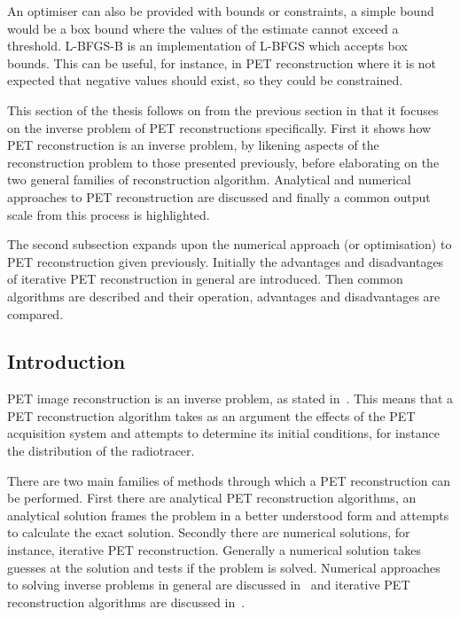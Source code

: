                 An optimiser can also be provided with bounds or constraints, a simple bound would be a box bound where the values of the estimate cannot exceed a threshold. \gls{L-BFGS-B} is an implementation of \gls{L-BFGS} which accepts box bounds. This can be useful, for instance, in \gls{PET} reconstruction where it is not expected that negative values should exist, so they could be constrained.
            
        This section of the thesis follows on from the previous section in that it focuses on the inverse problem of \gls{PET} reconstructions specifically. First it shows how \gls{PET} reconstruction is an inverse problem, by likening aspects of the reconstruction problem to those presented previously, before elaborating on the two general families of reconstruction algorithm. Analytical and numerical approaches to \gls{PET} reconstruction are discussed and finally a common output scale from this process is highlighted.
            
        The second subsection expands upon the numerical approach (or optimisation) to \gls{PET} reconstruction given previously. Initially the advantages and disadvantages of iterative \gls{PET} reconstruction in general are introduced. Then common algorithms are described and their operation, advantages and disadvantages are compared. 
        
        \subsection{Introduction} \label{sec:pet_image_reconstruction_introduction}
            \gls{PET} image reconstruction is an inverse problem, as stated in~. This means that a \gls{PET} reconstruction algorithm takes as an argument the effects of the \gls{PET} acquisition system and attempts to determine its initial conditions, for instance the distribution of the radiotracer.
            
            There are two main families of methods through which a \gls{PET} reconstruction can be performed. First there are analytical \gls{PET} reconstruction algorithms, an analytical solution frames the problem in a better understood form and attempts to calculate the exact solution.%
            Secondly there are numerical solutions, for instance, iterative \gls{PET} reconstruction. Generally a numerical solution takes guesses at the solution and tests if the problem is solved. Numerical approaches to solving inverse problems in general are discussed in~ and iterative \gls{PET} reconstruction algorithms are discussed in~.
            

